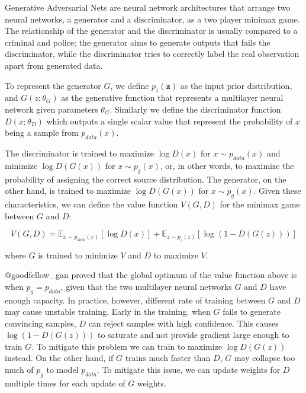 \documentclass[12pt,a4paper,]{report}
\begin{document}
Generative Adversarial Nets are neural network architectures that
arrange two neural networks, a generator and a discriminator, as a two
player minimax game. The relationship of the generator and the
discriminator is usually compared to a criminal and police; the
generator aims to generate outputs that fails the discriminator, while
the discriminator tries to correctly label the real observation apart
from generated data.

To represent the generator \(G\), we define \(p_z(\mathbf{z})\) as the
input prior distribution, and \(G(z; \theta_G)\) as the generative
function that represents a multilayer neural network given parameters
\(\theta_G\). Similarly we define the discriminator function
\(D(x; \theta_D)\) which outputs a single scalar value that represent
the probability of \(x\) being a sample from \(p_{data}(x)\).

The discriminator is trained to maximize \(\log D(x)\) for
\(x \sim p_{data}(x)\) and minimize \(\log D(G(x))\) for
\(x \sim p_g(x)\), or, in other words, to maximize the probability of
assigning the correct source distribution. The generator, on the other
hand, is trained to maximize \(\log D(G(x))\) for \(x \sim p_g(x)\).
Given these characteristics, we can define the value function
\(V(G, D)\) for the minimax game between \(G\) and \(D\):

\begin{equation}
    V(G, D) = \mathbb{E}_{x \sim p_{data}(x)}[\log D(x)] + \mathbb{E}_{z \sim p_{z}(z)}[\log (1 - D(G(z)))] \label{eq:gan}
\end{equation}

where \(G\) is trained to minimize \(V\) and \(D\) to maximize \(V\).

@goodfellow\_gan proved that the global optimum of the value function
above is when \(p_g = p_{data}\), given that the two multilayer neural
networks \(G\) and \(D\) have enough capacity. In practice, however,
different rate of training between \(G\) and \(D\) may cause unstable
training. Early in the training, when \(G\) fails to generate convincing
samples, \(D\) can reject samples with high confidence. This causes
\(\log (1 - D(G(z)))\) to saturate and not provide gradient large enough
to train \(G\). To mitigate this problem we can train to maximize
\(\log D(G(z))\) instead. On the other hand, if \(G\) trains much faster
than \(D\), \(G\) may collapse too much of \(p_g\) to model
\(p_{data}\). To mitigate this issue, we can update weights for \(D\)
multiple times for each update of \(G\) weights.
\end{document}
